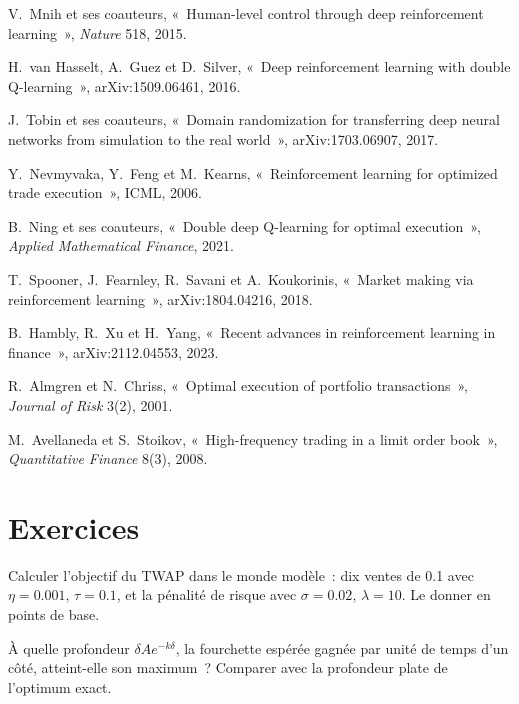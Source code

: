 \begin{omsources}
\item V.~Mnih et ses coauteurs, «~Human-level control through deep reinforcement learning~», \emph{Nature} 518, 2015.
\item H.~van Hasselt, A.~Guez et D.~Silver, «~Deep reinforcement learning with double Q-learning~», arXiv:1509.06461, 2016.
\item J.~Tobin et ses coauteurs, «~Domain randomization for transferring deep neural networks from simulation to the real
world~», arXiv:1703.06907, 2017.
\item Y.~Nevmyvaka, Y.~Feng et M.~Kearns, «~Reinforcement learning for optimized trade execution~», ICML, 2006.
\item B.~Ning et ses coauteurs, «~Double deep Q-learning for optimal execution~», \emph{Applied Mathematical Finance}, 2021.
\item T.~Spooner, J.~Fearnley, R.~Savani et A.~Koukorinis, «~Market making via reinforcement learning~», arXiv:1804.04216,
2018.
\item B.~Hambly, R.~Xu et H.~Yang, «~Recent advances in reinforcement learning in finance~», arXiv:2112.04553, 2023.
\item R.~Almgren et N.~Chriss, «~Optimal execution of portfolio transactions~», \emph{Journal of Risk} 3(2), 2001.
\item M.~Avellaneda et S.~Stoikov, «~High-frequency trading in a limit order book~», \emph{Quantitative Finance} 8(3), 2008.
\end{omsources}

\section{Exercices}

\begin{exercise}[$\star$]\label{exo:ml:reinforcement-learning-for-execution-and-market-making:1}
Calculer l'objectif du TWAP dans le monde modèle~: dix ventes de 0.1 avec $\eta = 0.001$, $\tau = 0.1$, et la pénalité de risque avec
$\sigma = 0.02$, $\lambda = 10$. Le donner en points de base.
\end{exercise}

\begin{exercise}[$\star$]\label{exo:ml:reinforcement-learning-for-execution-and-market-making:2}
À quelle profondeur $\delta Ae^{-k\delta}$, la fourchette espérée gagnée par unité de temps d'un côté, atteint-elle son maximum~? Comparer avec la
profondeur plate de l'optimum exact.
\end{exercise}

